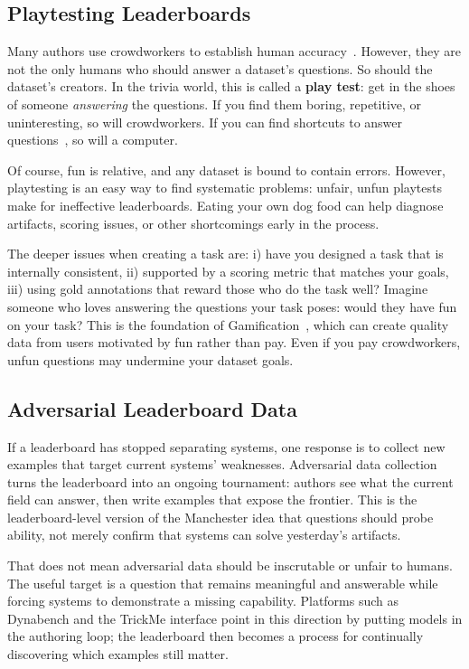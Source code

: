 \subsection{Playtesting Leaderboards}
\label{sec:fun}

Many authors use crowdworkers to establish human accuracy~\citep{rajpurkar-16,choi-18}.
However, they are not the only humans who should answer a dataset's questions.
So should the dataset's creators.
%
In the trivia world, this is called a {\bf play test}: get in the shoes of
someone \emph{answering} the questions. If you find them boring, repetitive, or
uninteresting, so will crowdworkers. If you can find shortcuts to answer
questions~\citep{rondeau-18,kaushik-18}, so will a computer.

Of course, fun is relative, and any dataset is bound to contain errors.
However, playtesting is an easy way to find systematic problems: unfair, unfun
playtests make for ineffective leaderboards. Eating your own dog food can help
diagnose artifacts, scoring issues, or other shortcomings early in the process.

The deeper issues when creating a  task are: i) have you designed a
task that is internally consistent, ii) supported by a scoring metric that
matches your goals, iii) using gold annotations that reward those who do the
task well? Imagine someone who loves answering the questions your task poses:
would they have fun on your task? This is the foundation of
Gamification~\citep{ahn-06}, which can create quality data from users motivated
by fun rather than pay. Even if you pay crowdworkers, unfun questions may
undermine your dataset goals.

\subsection{Adversarial Leaderboard Data}
\label{sec:leaderboards:adversarial}

If a leaderboard has stopped separating systems, one response is to collect new
examples that target current systems' weaknesses. Adversarial data collection
turns the leaderboard into an ongoing tournament: authors see what the current
field can answer, then write examples that expose the frontier. This is the
leaderboard-level version of the Manchester idea that questions should probe
ability, not merely confirm that systems can solve yesterday's artifacts.

That does not mean adversarial data should be inscrutable or unfair to humans.
The useful target is a question that remains meaningful and answerable while
forcing systems to demonstrate a missing capability. Platforms such as
Dynabench and the TrickMe interface point in this direction by putting models
in the authoring loop; the leaderboard then becomes a process for continually
discovering which examples still matter.


